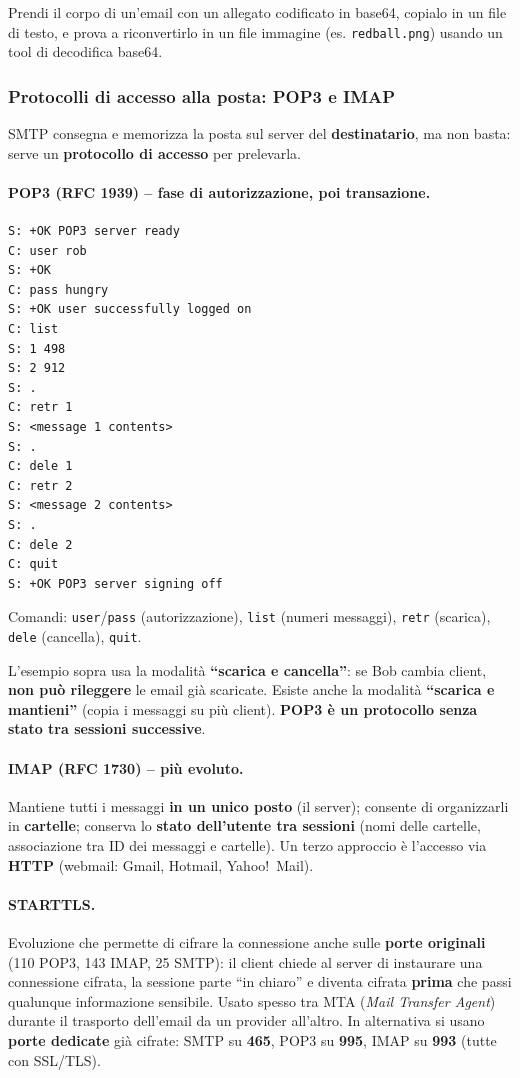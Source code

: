 \documentclass[12pt, a4paper]{article}
\begin{document}
\begin{tcolorbox}[colback=orange!5, colframe=orange!70!black, title=\textbf{Esercizio pratico 2.4}]
Prendi il corpo di un'email con un allegato codificato in base64, copialo in un file di testo, e prova a riconvertirlo in un file immagine (es. \texttt{redball.png}) usando un tool di decodifica base64.
\end{tcolorbox}

\subsubsection{Protocolli di accesso alla posta: POP3 e IMAP}

SMTP consegna e memorizza la posta sul server del \textbf{destinatario}, ma non basta: serve un \textbf{protocollo di accesso} per prelevarla.

\paragraph{POP3 (RFC 1939) -- fase di autorizzazione, poi transazione.}
\begin{verbatim}
S: +OK POP3 server ready
C: user rob
S: +OK
C: pass hungry
S: +OK user successfully logged on
C: list
S: 1 498
S: 2 912
S: .
C: retr 1
S: <message 1 contents>
S: .
C: dele 1
C: retr 2
S: <message 2 contents>
S: .
C: dele 2
C: quit
S: +OK POP3 server signing off
\end{verbatim}
Comandi: \texttt{user}/\texttt{pass} (autorizzazione), \texttt{list} (numeri messaggi), \texttt{retr} (scarica), \texttt{dele} (cancella), \texttt{quit}.

L'esempio sopra usa la modalità \textbf{``scarica e cancella''}: se Bob cambia client, \textbf{non può rileggere} le email già scaricate. Esiste anche la modalità \textbf{``scarica e mantieni''} (copia i messaggi su più client). \textbf{POP3 è un protocollo senza stato tra sessioni successive}.

\paragraph{IMAP (RFC 1730) -- più evoluto.} Mantiene tutti i messaggi \textbf{in un unico posto} (il server); consente di organizzarli in \textbf{cartelle}; conserva lo \textbf{stato dell'utente tra sessioni} (nomi delle cartelle, associazione tra ID dei messaggi e cartelle). Un terzo approccio è l'accesso via \textbf{HTTP} (webmail: Gmail, Hotmail, Yahoo!\ Mail).

\paragraph{STARTTLS.} Evoluzione che permette di cifrare la connessione anche sulle \textbf{porte originali} (110 POP3, 143 IMAP, 25 SMTP): il client chiede al server di instaurare una connessione cifrata, la sessione parte ``in chiaro'' e diventa cifrata \textbf{prima} che passi qualunque informazione sensibile. Usato spesso tra MTA (\textit{Mail Transfer Agent}) durante il trasporto dell'email da un provider all'altro. In alternativa si usano \textbf{porte dedicate} già cifrate: SMTP su \textbf{465}, POP3 su \textbf{995}, IMAP su \textbf{993} (tutte con SSL/TLS).
\end{document}
